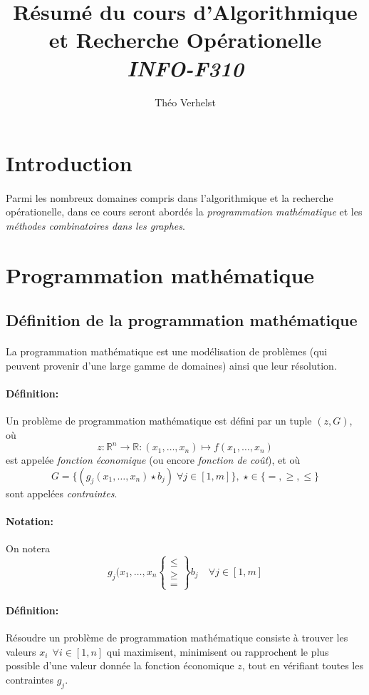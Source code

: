 \documentclass[a4paper]{article}
\author{Théo Verhelst}
\title{Résumé du cours d'Algorithmique et Recherche Opérationelle\\
\emph{INFO-F310}}
\begin{document}
\maketitle
\tableofcontents

\section{Introduction}
\paragraph{}
Parmi les nombreux domaines compris dans l'algorithmique et la recherche
opérationelle, dans ce cours seront abordés la \emph{programmation mathématique}
et les \emph{méthodes combinatoires dans les graphes}.

\section{Programmation mathématique}
\subsection{Définition de la programmation mathématique}
\paragraph{}
La programmation mathématique est une modélisation de problèmes (qui peuvent
provenir d'une large gamme de domaines) ainsi que leur résolution.
\paragraph{Définition:} Un problème de programmation mathématique est défini
par un tuple \((z, G)\), où
\[z:\mathbb{R}^n\to\mathbb{R}:(x_1,\dots,x_n)\mapsto f(x_1,\dots,x_n)\]
est appelée \emph{fonction économique} (ou encore \emph{fonction de coût}), et
où \[G=\{(g_j(x_1,\dots,x_n)\star b_j)\;\forall j\in[1,m]\},\;\star\in\{=,\ge,\le\}\]
sont appelées \emph{contraintes}.
\paragraph{Notation:}On notera
\[g_j(x_1,\dots,x_n\begin{Bmatrix}\le\\\ge\\=\end{Bmatrix}b_j\quad\forall j\in[1,m]\]
\paragraph{Définition:}
Résoudre un problème de programmation mathématique consiste à trouver les
valeurs \(x_i\;\,\forall i\in[1,n]\) qui maximisent, minimisent ou rapprochent
le plus possible d'une valeur donnée la fonction économique \(z\),
tout en vérifiant toutes les contraintes \(g_j\).
\end{document}

